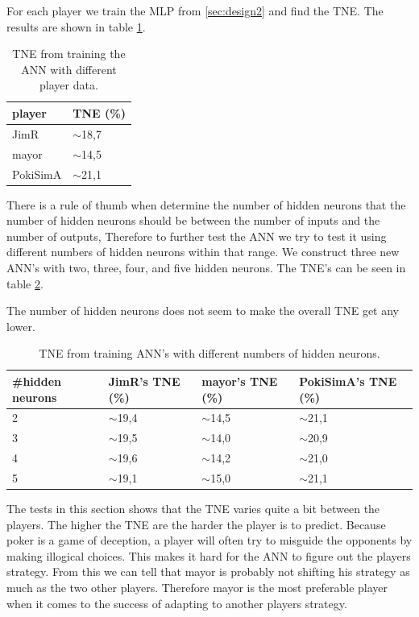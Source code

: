 For each player we train the MLP from \ref{sec:design2} and find the TNE. The results are shown in table \ref{tab:tneg3}.

\vspace{4mm}
\begin{table}[H]
\center
\begin{tabular}{ | l | l |}
  \hline
  player & TNE (\%) \\
  \hline
  JimR & $\sim$18,7 \\
  mayor & $\sim$14,5 \\
  PokiSimA & $\sim$21,1 \\
  \hline
\end{tabular}
\caption{TNE from training the ANN with different player data.\label{tab:tneg3}}
\end{table}
\vspace{4mm}

There is a rule of thumb when determine the number of hidden neurons that the number of hidden neurons should be between the number of inputs and the number of outputs,
Therefore to further test the ANN we try to test it using different numbers of hidden neurons within that range. We construct three new ANN's with two, three, four, and five hidden neurons. The TNE's can be seen in table \ref{tab:tneg4}. 

The number of hidden neurons does not seem to make the overall TNE get any lower.

\vspace{4mm}
\begin{table}[H]
\center
\begin{tabular}{ | l | l | l | l | }
  \hline
  \#hidden neurons & JimR's TNE (\%) & mayor's TNE (\%) & PokiSimA's TNE (\%) \\
  \hline
  2 & $\sim$19,4 & $\sim$14,5 & $\sim$21,1 \\
  3 & $\sim$19,5 & $\sim$14,0 & $\sim$20,9 \\
  4 & $\sim$19,6 & $\sim$14,2 & $\sim$21,0 \\
  5 & $\sim$19,1 & $\sim$15,0 & $\sim$21,1 \\
  \hline
\end{tabular}
\caption{TNE from training ANN's with different numbers of hidden neurons.\label{tab:tneg4}}
\end{table}
\vspace{4mm}

The tests in this section shows that the TNE varies quite a bit between the players. The higher the TNE are the harder the player is to predict. Because poker is a game of deception, a player will often try to misguide the opponents by making illogical choices. This makes it hard for the ANN to figure out the players strategy.
From this we can tell that mayor is probably not shifting his strategy as much as the two other players. Therefore mayor is the most preferable player when it comes to the success of adapting to another players strategy.


